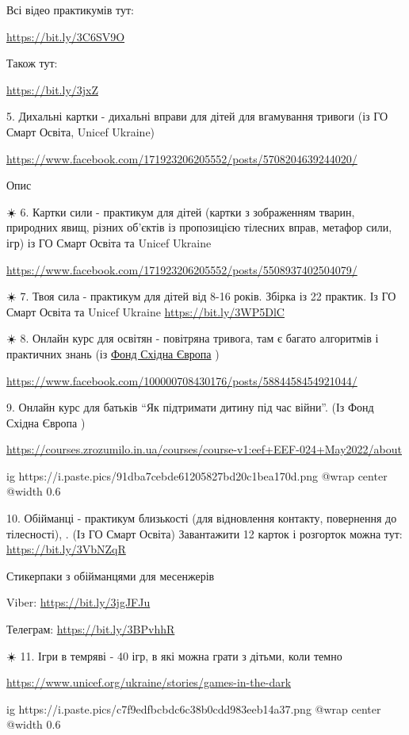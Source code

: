 Всі відео практикумів тут:

\url{https://bit.ly/3C6SV9O}

Також тут:

\url{https://bit.ly/3jxZ}

5. Дихальні картки - дихальні вправи для дітей для вгамування тривоги (із ГО
Смарт Освіта, Unicef Ukraine)

\url{https://www.facebook.com/171923206205552/posts/5708204639244020/}

Опис 

☀️ 6. Картки сили - практикум для дітей (картки з зображенням тварин, природних
явищ, різних об'єктів із пропозицією тілесних вправ, метафор сили, ігр) із ГО
Смарт Освіта та Unicef Ukraine

\url{https://www.facebook.com/171923206205552/posts/5508937402504079/}

☀️ 7. Твоя сила - практикум для дітей від 8-16 років. Збірка із 22 практик. Із
ГО Смарт Освіта та Unicef Ukraine \url{https://bit.ly/3WP5DlC}

☀️ 8.  Онлайн курс для освітян - повітряна тривога, там є багато алгоритмів і
практичних знань (із \href{https://www.facebook.com/eef.org.ua}{Фонд Східна Європа} )

\url{https://www.facebook.com/100000708430176/posts/5884458454921044/}

9. Онлайн курс для батьків \enquote{Як підтримати дитину під час війни}. (Із Фонд Східна Європа )

\url{https://courses.zrozumilo.in.ua/courses/course-v1:eef+EEF-024+May2022/about}

\ifcmt
  ig https://i.paste.pics/91dba7cebde61205827bd20c1bea170d.png
  @wrap center
  @width 0.6
\fi

10. Обійманці - практикум близькості (для відновлення контакту, повернення до
тілесності), . (Із ГО Смарт Освіта) Завантажити 12 карток і розгорток можна
тут: \url{https://bit.ly/3VbNZqR}

Стикерпаки з обійманцями для месенжерів

Viber: \url{https://bit.ly/3jgJFJu} 

Телеграм: \url{https://bit.ly/3BPvhhR}

☀️ 11. Ігри в темряві - 40 ігр, в які можна грати з дітьми, коли темно

\url{https://www.unicef.org/ukraine/stories/games-in-the-dark}

\ifcmt
  ig https://i.paste.pics/c7f9edfbcbdc6c38b0cdd983eeb14a37.png
  @wrap center
  @width 0.6
\fi

